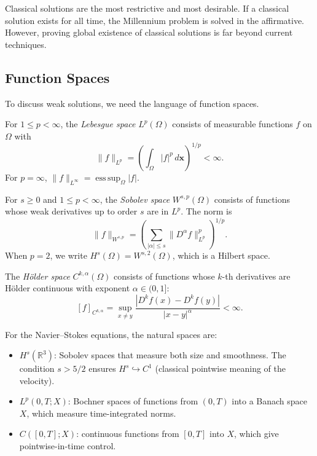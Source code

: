 Classical solutions are the most restrictive and most desirable. If a classical solution exists for all time, the Millennium problem is solved in the affirmative. However, proving global existence of classical solutions is far beyond current techniques.

\subsection{Function Spaces}

To discuss weak solutions, we need the language of function spaces.

\begin{definition}
For $1 \le p < \infty$, the \textit{Lebesgue space} $L^p(\Omega)$ consists of measurable functions $f$ on $\Omega$ with
\[
\|f\|_{L^p} = \left( \int_\Omega |f|^p \, d\mathbf{x} \right)^{1/p} < \infty.
\]
For $p = \infty$, $\|f\|_{L^\infty} = \operatorname{ess\,sup}_\Omega |f|$.
\end{definition}

\begin{definition}
For $s \ge 0$ and $1 \le p < \infty$, the \textit{Sobolev space} $W^{s,p}(\Omega)$ consists of functions whose weak derivatives up to order $s$ are in $L^p$. The norm is
\[
\|f\|_{W^{s,p}} = \left( \sum_{|\alpha| \le s} \|D^\alpha f\|_{L^p}^p \right)^{1/p}.
\]
When $p = 2$, we write $H^s(\Omega) = W^{s,2}(\Omega)$, which is a Hilbert space.
\end{definition}

\begin{definition}
The \textit{H\"older space} $C^{k,\alpha}(\Omega)$ consists of functions whose $k$-th derivatives are H\"older continuous with exponent $\alpha \in (0, 1]$:
\[
[f]_{C^{k,\alpha}} = \sup_{x \ne y} \frac{|D^k f(x) - D^k f(y)|}{|x - y|^\alpha} < \infty.
\]
\end{definition}

For the Navier--Stokes equations, the natural spaces are:
\begin{itemize}
\item $H^s(\mathbb{R}^3)$: Sobolev spaces that measure both size and smoothness. The condition $s > 5/2$ ensures $H^s \hookrightarrow C^1$ (classical pointwise meaning of the velocity).
\item $L^p(0, T; X)$: Bochner spaces of functions from $(0, T)$ into a Banach space $X$, which measure time-integrated norms.
\item $C([0, T]; X)$: continuous functions from $[0, T]$ into $X$, which give pointwise-in-time control.
\end{itemize}

